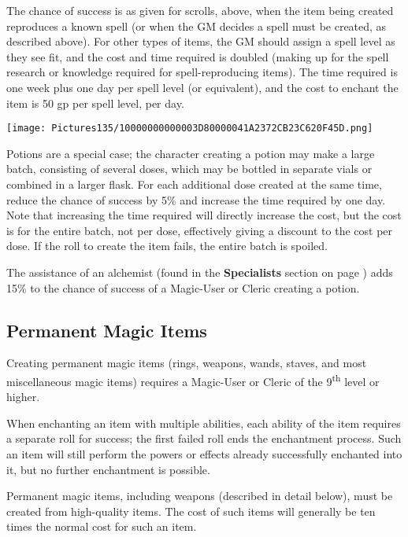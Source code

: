 \documentclass[a4paper,twoside,openany,10pt]{book}
\begin{document}
\begin{multicols}{2}
The chance of success is as given for scrolls, above, when the item being created reproduces a known spell (or when the GM decides a spell must be created, as described above). For other types of items, the GM should assign a spell level as they see fit, and the cost and time required is doubled (making up for the spell research or knowledge required for spell-reproducing items). The time required is one week plus one day per spell level (or equivalent), and the cost to enchant the item is 50 gp per spell level, per day.

\begin{center}
	\texttt{[image: Pictures135/10000000000003D80000041A2372CB23C620F45D.png]}
\end{center}

Potions are a special case; the character creating a potion may make a large batch, consisting of several doses, which may be bottled in separate vials or combined in a larger flask. For each additional dose created at the same time, reduce the chance of success by 5\% and increase the time required by one day. Note that increasing the time required will directly increase the cost, but the cost is for the entire batch, not per dose, effectively giving a discount to the cost per dose. If the roll to create the item fails, the entire batch is spoiled.

The assistance of an alchemist (found in the \textbf{Specialists} section on page \hyperlink{Alchemistux20Entry}{\pageref{Alchemistux20Entry}}) adds 15\% to the chance of success of a Magic-User or Cleric creating a potion.

\subsection{Permanent Magic Items}\label{permanent-magic-items}

Creating permanent magic items (rings, weapons, wands, staves, and most miscellaneous magic items) requires a Magic-User or Cleric of the 9\textsuperscript{th} level or higher.

When enchanting an item with multiple abilities, each ability of the item requires a separate roll for success; the first failed roll ends the enchantment process. Such an item will still perform the powers or effects already successfully enchanted into it, but no further enchantment is possible.

Permanent magic items, including weapons (described in detail below), must be created from high-quality items. The cost of such items will generally be ten times the normal cost for such an item.


\end{multicols}
\end{document}
